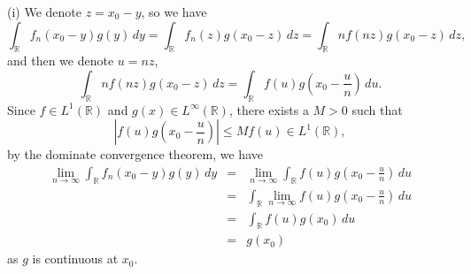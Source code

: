 \documentclass[12pt,a4paper]{ctexart}
\begin{document}
(i) We denote $z = x_{0} - y$, so we have
\begin{equation*}
    \int_{\mathbb{R}}^{} f_{n}(x_{0} - y) g(y) \, d y = \int_{\mathbb{R}}^{} f_{n}(z) g(x_{0} - z) \, d z = \int_{\mathbb{R}}^{} n f(n z) g(x_{0} - z) \, d z,
\end{equation*}
and then we denote $u = n z$,
\begin{equation*}
    \int_{\mathbb{R}}^{} n f(n z) g(x_{0} - z) \, d z = \int_{\mathbb{R}}^{}  f(u) g(x_{0} - \frac{u}{n}) \, d u.
\end{equation*}
Since $f \in L^{1} (\mathbb{R})$ and $g(x) \in L^{\infty}(\mathbb{R})$, there exists a $M > 0$ such that
\begin{equation*}
    |f(u) g(x_{0} - \frac{u}{n})| \leq M f(u) \in L^{1}(\mathbb{R}),
\end{equation*}
by the dominate convergence theorem, we have
\begin{eqnarray*}
    \lim_{n \to \infty} \int_{\mathbb{R}}^{} f_{n}(x_{0} - y) g(y) \, d y & = &  \lim_{n \to \infty} \int_{\mathbb{R}}^{}  f(u) g(x_{0} - \frac{u}{n}) \, d u \\
    & = & \int_{\mathbb{R}}^{} \lim_{n \to \infty} f(u) g(x_{0} - \frac{u}{n}) \, d u \\
    & = & \int_{\mathbb{R}}^{} f(u) g(x_{0}) \, d u \\
    & = & g(x_{0})
\end{eqnarray*}
as $g$ is continuous at $x_{0}$.

\vspace{4pt}
\end{document}
